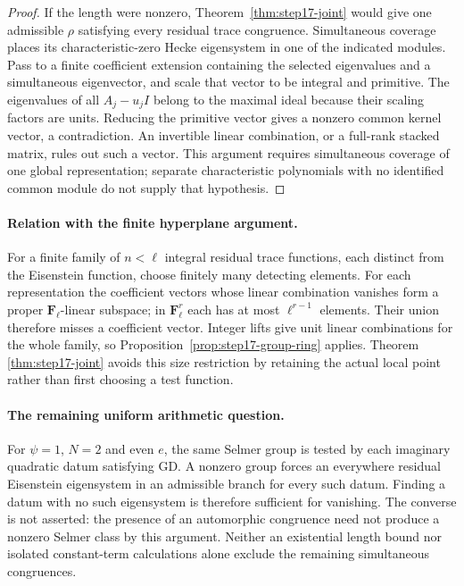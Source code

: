\begin{proof}
If the length were nonzero, Theorem~\ref{thm:step17-joint} would give
one admissible $\rho$ satisfying every residual trace congruence.
Simultaneous coverage places its characteristic-zero Hecke eigensystem
in one of the indicated modules. Pass to a finite coefficient extension
containing the selected eigenvalues and a simultaneous eigenvector,
and scale that vector to be integral and primitive. The eigenvalues
of all $A_j-u_jI$ belong to the maximal ideal because their scaling
factors are units. Reducing the primitive vector gives a nonzero common
kernel vector, a contradiction. An invertible linear combination, or
a full-rank stacked matrix, rules out such a vector. This argument
requires simultaneous coverage of one global representation; separate
characteristic polynomials with no identified common module do not
supply that hypothesis.
\end{proof}

\paragraph{Relation with the finite hyperplane argument.}
For a finite family of $n<\ell$ integral residual trace functions, each
distinct from the Eisenstein function, choose finitely many detecting
elements. For each representation the coefficient vectors whose linear
combination vanishes form a proper $\mathbf F_\ell$-linear subspace;
in $\mathbf F_\ell^r$ each has at most $\ell^{r-1}$ elements.
Their union therefore misses a coefficient vector. Integer lifts give
unit linear combinations for the whole family, so
Proposition~\ref{prop:step17-group-ring} applies. Theorem
\ref{thm:step17-joint} avoids this size restriction by retaining the
actual local point rather than first choosing a test function.

\paragraph{The remaining uniform arithmetic question.}
For $\psi=1$, $N=2$ and even $e$, the same Selmer group is tested by
each imaginary quadratic datum satisfying $\mathrm{GD}$. A nonzero
group forces an everywhere residual Eisenstein eigensystem in an
admissible branch for every such datum. Finding a datum with no such
eigensystem is therefore sufficient for vanishing. The converse is not
asserted: the presence of an automorphic congruence need not produce a
nonzero Selmer class by this argument. Neither an existential length
bound nor isolated constant-term calculations alone exclude the
remaining simultaneous congruences.
